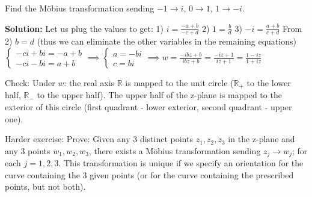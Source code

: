 \documentclass[12pt]{article}
\begin{document}
\begin{example}
Find the Möbius transformation sending $-1 \to i$, $0 \to 1$, $1 \to -i$.

\textbf{Solution:} Let us plug the values to get:
1) $i = \frac{-a+b}{-c+d}$
2) $1 = \frac{b}{d}$
3) $-i = \frac{a+b}{c+d}$
From 2) $b=d$ (thus we can eliminate the other variables in the remaining equations)
$\begin{cases} -ci+bi = -a+b \\ -ci-bi = a+b \end{cases} \implies \begin{cases} a = -bi \\ c = bi \end{cases} \implies w = \frac{-ibz+b}{ibz+b} = \frac{-iz+1}{iz+1} = \frac{1-iz}{1+iz}$

Check: Under $w$: the real axis $\mathbb{R}$ is mapped to the unit circle ($\mathbb{R}_+$ to the lower half, $\mathbb{R}_-$ to the upper half). The upper half of the z-plane is mapped to the exterior of this circle (first quadrant - lower exterior, second quadrant - upper one).
\end{example}

Harder exercise: Prove: Given any 3 distinct points $z_1, z_2, z_3$ in the z-plane and any 3 points $w_1, w_2, w_3$, there exists a Möbius transformation sending $z_j \to w_j$; for each $j=1,2,3$. This transformation is unique if we specify an orientation for the curve containing the 3 given points (or for the curve containing the prescribed points, but not both).
\end{document}
